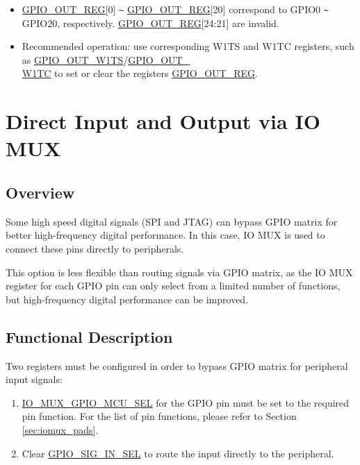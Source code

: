 \documentclass[main\_\_EN.tex]{subfiles}
\begin{document}
\begin{tiplisting}
\vspace{-2em}
\begin{itemize}
\item \hyperref[regdesc:GPIOOUTREG]{GPIO\_OUT\_REG}[0] \verb+~+ \hyperref[regdesc:GPIOOUTREG]{GPIO\_OUT\_REG}[20] correspond to GPIO0 \verb+~+ GPIO20, respectively.  \hyperref[regdesc:GPIOOUTREG]{GPIO\_OUT\_REG}[24:21] are invalid.
\item Recommended operation: use corresponding W1TS and W1TC registers, such as \hyperref[fielddesc:GPIOOUTW1TS]{GPIO\_OUT\_W1TS}/\hyperref[fielddesc:GPIOOUTW1TC]{GPIO\_OUT\_\\W1TC} to set or clear the registers \hyperref[regdesc:GPIOOUTREG]{GPIO\_OUT\_REG}.
\end{itemize}
\end{tiplisting}

\section{Direct Input and Output via IO MUX}

\subsection{Overview}

Some high speed digital signals (SPI and JTAG) can bypass GPIO matrix for better high-frequency digital performance. In this case, IO MUX is used to connect these pins directly to peripherals.

This option is less flexible than routing signals via GPIO matrix, as the IO MUX register for each GPIO pin can only select from a limited number of functions, but high-frequency digital performance can be improved.

\subsection{Functional Description}

Two registers must be configured in order to bypass GPIO matrix for peripheral input signals:

\begin{enumerate}
\item \hyperref[fielddesc:IOMUXGPIONMCUSEL]{IO\_MUX\_GPIO\_MCU\_SEL} for the GPIO pin must be set to the required pin function. For the list of pin functions, please refer to Section  \ref{sec:iomux_pads}.
\item Clear \hyperref[fielddesc:GPIOSIGNINSEL]{GPIO\_SIG\_IN\_SEL} to route the input directly to the peripheral.
\end{enumerate}
\end{document}
